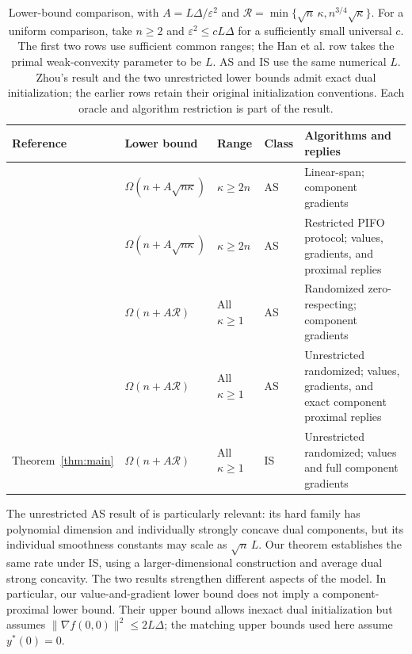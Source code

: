 \documentclass[11pt,letterpaper]{article}
\theoremstyle{definition}
\theoremstyle{remark}
\newcommand{\cR}{\mathcal R}
\begin{document}
\begin{table}[t]
\centering
\small
\setlength{\tabcolsep}{3.5pt}
\renewcommand{\arraystretch}{1.18}
\begin{tabularx}{\textwidth}{@{}p{}p{}p{}p{}Y@{}}
\toprule
Reference & Lower bound & Range & Class & Algorithms and replies\\
\midrule
\citet{zhang2021}
 & $\Omega(n+A\sqrt{n\kappa})$ & $\kappa\ge2n$ & AS
 & Linear-span; component gradients\\
\citet{han2024}
 & $\Omega(n+A\sqrt{n\kappa})$ & $\kappa\ge2n$ & AS
 & Restricted PIFO protocol; values, gradients, and proximal replies\\
\citet{zhou2026}
 & $\Omega(n+A\cR)$ & All $\kappa\ge1$ & AS
 & Randomized zero-respecting; component gradients\\
\citet{pengprox2026}
 & $\Omega(n+A\cR)$ & All $\kappa\ge1$ & AS
 & Unrestricted randomized; values, gradients, and exact component proximal replies\\
Theorem~\ref{thm:main}
 & $\Omega(n+A\cR)$ & All $\kappa\ge1$ & IS
 & Unrestricted randomized; values and full component gradients\\
\bottomrule
\end{tabularx}
\caption{Lower-bound comparison, with $A=L\Delta/\varepsilon^2$ and
$\cR=\min\{\sqrt n\,\kappa,n^{3/4}\sqrt\kappa\}$.
For a uniform comparison, take $n\ge2$ and
$\varepsilon^2\le cL\Delta$ for a sufficiently small universal $c$.
The first two rows use sufficient common ranges; the Han et al. row takes
the primal weak-convexity parameter to be $L$.
AS and IS use the same numerical $L$. Zhou's result and the two
unrestricted lower bounds admit exact dual initialization; the earlier rows
retain their original initialization conventions. Each oracle and algorithm
restriction is part of the result.}
\label{tab:lower-comparison}
\end{table}

The unrestricted AS result of \citet{pengprox2026} is particularly relevant:
its hard family has polynomial dimension and individually strongly concave
dual components, but its individual smoothness constants may scale as
$\sqrt n\,L$. Our theorem establishes the same rate under IS, using a
larger-dimensional construction and average dual strong concavity. The two
results strengthen different aspects of the model. In particular, our
value-and-gradient lower bound does not imply a component-proximal lower
bound. Their upper bound allows inexact dual initialization but assumes
$\|\nabla f(0,0)\|^2\le2L\Delta$; the matching upper bounds used here
assume $y^*(0)=0$.
\end{document}
